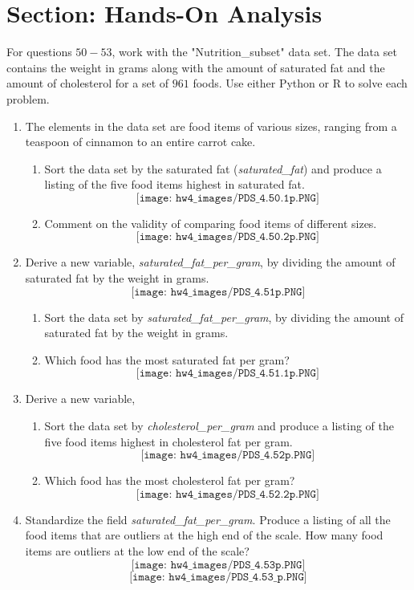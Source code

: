 \documentclass[11pt]{article}
\theoremstyle{definition}
\newcommand{\1}[1]{\mathbf{1} \left \{ #1 \right \}}
\begin{document}
\section{Section: Hands-On Analysis}
For questions $50-53$, work with the "Nutrition\_subset" data set.  The data set contains the weight in grams along with the amount of saturated fat and the amount of cholesterol for a set of $961$ foods.  Use either Python or R to solve each problem.
\begin{enumerate}\addtocounter{enumi}{49}
    \item The elements in the data set are food items of various sizes, ranging from a teaspoon of cinnamon to an entire carrot cake.
    \begin{enumerate}[(1)]
        \item Sort the data set by the saturated fat (\textit{saturated\_fat}) and produce a listing of the five food items highest in saturated fat.
        \[\texttt{[image: hw4\_images/PDS\_4.50.1p.PNG]}\]
        \item Comment on the validity of comparing food items of different sizes.
        \[\texttt{[image: hw4\_images/PDS\_4.50.2p.PNG]}\]
    \end{enumerate}
    \item Derive a new variable, \textit{saturated\_fat\_per\_gram}, by dividing the amount of saturated fat by the weight in grams.
     \[\texttt{[image: hw4\_images/PDS\_4.51p.PNG]}\]
    \begin{enumerate}[(1)]
        \item Sort the data set by \textit{saturated\_fat\_per\_gram}, by dividing the amount of saturated fat by the weight in grams.
        \item Which food has the most saturated fat per gram?
        \[\texttt{[image: hw4\_images/PDS\_4.51.1p.PNG]}\]
    \end{enumerate}
    \item Derive a new variable,
    \begin{enumerate}[(1)]
        \item Sort the data set by \textit{cholesterol\_per\_gram} and produce a listing of the five food items highest in cholesterol fat per gram.
        \[\texttt{[image: hw4\_images/PDS\_4.52p.PNG]}\]
        \item Which food has the most cholesterol fat per gram?
        \[\texttt{[image: hw4\_images/PDS\_4.52.2p.PNG]}\]
    \end{enumerate}
    \item Standardize the field \textit{saturated\_fat\_per\_gram}.  Produce a listing of all the food items that are outliers at the high end of the scale.  How many food items are outliers at the low end of the scale?
    \[\texttt{[image: hw4\_images/PDS\_4.53p.PNG]}\]
    \[\texttt{[image: hw4\_images/PDS\_4.53\_p.PNG]}\]
\end{enumerate}
\end{document}
